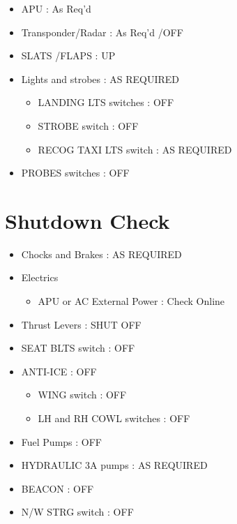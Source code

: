 \begin{itemize}
\item APU : As Req'd

\item Transponder\slash Radar : As Req'd \slash  OFF

\item SLATS \slash  FLAPS : UP

\item Lights and strobes : AS REQUIRED

\begin{itemize}
\item LANDING LTS switches : OFF

\item STROBE switch : OFF

\item RECOG TAXI LTS switch : AS REQUIRED

\end{itemize}

\item PROBES switches : OFF

\end{itemize}

\section{Shutdown Check}
\label{shutdowncheck}

\begin{itemize}
\item Chocks and Brakes : AS REQUIRED

\item Electrics

\begin{itemize}
\item APU or AC External Power : Check Online

\end{itemize}

\item Thrust Levers : SHUT OFF

\item SEAT BLTS switch : OFF

\item ANTI-ICE : OFF

\begin{itemize}
\item WING switch : OFF

\item LH and RH COWL switches : OFF

\end{itemize}

\item Fuel Pumps : OFF

\item HYDRAULIC 3A pumps : AS REQUIRED

\item BEACON : OFF

\item N\slash W STRG switch : OFF

\end{itemize}


